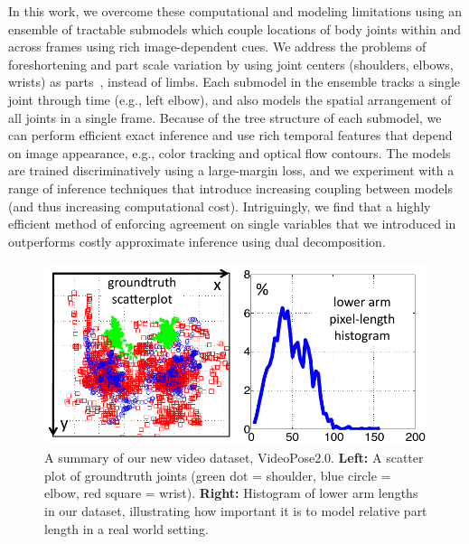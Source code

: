 In this work, we overcome these computational and modeling limitations
using an ensemble of tractable submodels which couple
locations of body joints within and across frames using rich
image-dependent cues.  We address the problems of foreshortening and
part scale variation by using joint centers (shoulders, elbows,
wrists) as parts~\cite{lee06,urtasun08,rogez08}, instead of
limbs. Each submodel in the ensemble tracks a
single joint through time (e.g., left elbow), and also models the
spatial arrangement of all joints in a single frame.  Because of the
tree structure of each submodel, we can perform efficient exact
inference and use rich temporal features that depend on image
appearance, e.g., color tracking and optical flow contours. The models
are trained discriminatively using a large-margin loss, and we
experiment with a range of inference techniques that introduce
increasing coupling between models (and thus increasing computational
cost). Intriguingly, we find that a highly efficient method of
enforcing agreement on single variables that we introduced in
\cite{weisssapp10} outperforms costly approximate inference using dual
decomposition.

\begin{figure}[tb!]
\centering
\includegraphics[width=0.9\linewidth]{figs/videopose-dataset-stats.pdf}
\caption[VideoPose2.0 statistics]{\label{fig:dataset} A summary of our new 
video dataset, VideoPose2.0.  \textbf{Left:} A scatter plot of groundtruth 
joints (green dot = shoulder, blue circle = elbow, red square = wrist).  
\textbf{Right:} Histogram of lower arm lengths in our dataset, illustrating how 
important it is to model relative part length in a real world setting.  }
\label{fig:videopose-dataset-stats}
\end{figure}



